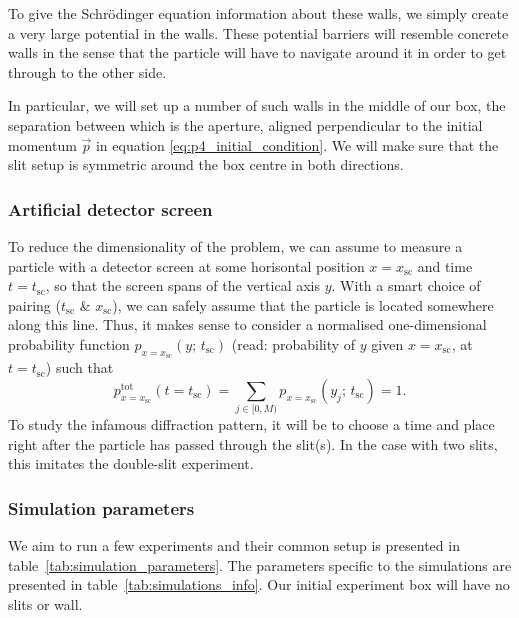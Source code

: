         To give the Schrödinger equation information about these walls, we simply create a very large potential in the walls. These potential barriers will resemble concrete  walls in the sense that the particle will have to navigate around it in order to get through to the other side.

        In particular, we will set up a number of such walls in the middle of our box, the separation between which is the aperture, aligned perpendicular to the initial momentum $\vec{p}$ in equation \eqref{eq:p4_initial_condition}. We will make sure that the slit setup is symmetric around the box centre in both directions. 


    \subsubsection{Artificial detector screen}\label{sec:method:screen}

        To reduce the dimensionality of the problem, we can assume to measure a particle with a detector screen at some horisontal position $x=x_\mathrm{sc}$ and time $t=t_\mathrm{sc}$, so that the screen spans of the vertical axis $y$. With a smart choice of pairing ($t_\mathrm{sc}$ \& $x_\mathrm{sc}$), we can safely assume that the particle is located somewhere along this line. Thus, it makes sense to consider a normalised one-dimensional probability function $p_{x=x_\mathrm{sc}}(y;\, t_\mathrm{sc})$ (read: probability of $y$ given $x=x_\mathrm{sc}$, at $t=t_\mathrm{sc}$) such that
        \begin{equation}\label{eq:tot_probability_along_y}
            p^\mathrm{tot}_{x=x_\mathrm{sc}}(t\!=\!t_\mathrm{sc}) =\sum_{j\in [0, M)} p_{x=x_\mathrm{sc}}(y_j;\, t_\mathrm{sc}) = 1.
        \end{equation}
        To study the infamous diffraction pattern, it will be  to choose a time and place right after the particle has passed through the slit(s). In the case with two slits, this  imitates the double-slit experiment.



    \subsubsection{Simulation parameters}\label{sec:method:simulation_parameters}

        We aim to run a few experiments and their common setup is presented in table~\ref{tab:simulation_parameters}. The parameters specific to the simulations are presented in table~\ref{tab:simulations_info}. Our initial experiment box will have no slits or wall.

